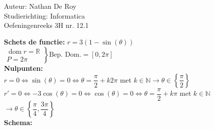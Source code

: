 \documentclass[a4paper]{article}
\begin{document}
\noindent \large Auteur: Nathan De Roy \\
\noindent \large Studierichting: Informatica\\
\noindent \large Oefeningenreeks 3H nr. 12.1\\

\medskip
\normalsize


\noindent \textbf{Schets de functie:} $r = 3(1 - \sin(\theta))$\\

$\left .
\begin{array}{l}
    \operatorname{dom} r    = \mathbb{R}\\
    P                       = 2\pi
\end{array}
\right \}
\text{Bep. Dom.} = [0, 2\pi]$\\

\noindent \textbf{Nulpunten:}\\

$r = 0 \Leftrightarrow \sin(\theta) = 0 \Leftrightarrow \theta = \dfrac{\pi}{2}+ k2\pi$ met $k \in \mathbb{N} \longrightarrow \theta \in \left\{\dfrac{\pi}{2}\right\}$\\

$r' = 0 \Leftrightarrow -3\cos(\theta) = 0 \Leftrightarrow \cos(\theta) = 0 \Leftrightarrow \theta = \dfrac{\pi}{2} + k\pi$ met $k \in \mathbb{N}$\\

$\longrightarrow \theta \in \left\{ \dfrac{\pi}{4}, \dfrac{3\pi}{4}\right\}$\\

\noindent \textbf{Schema:}\\

\end{document}

